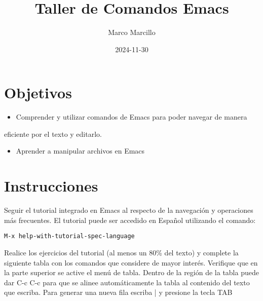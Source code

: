 \documentclass{article}
\author{Marco Marcillo}
\date{2024-11-30}
\title{Taller de Comandos Emacs}
\begin{document}
\maketitle
{}
\thispagestyle{fancy}






\section{Objetivos}
\label{sec:orgf910b6f}

\begin{itemize}
\item Comprender y utilizar comandos de Emacs para poder navegar de manera
\end{itemize}
eficiente por el texto y editarlo.

\begin{itemize}
\item Aprender a manipular archivos en Emacs
\end{itemize}

\section{Instrucciones}
\label{sec:orgdba02da}
Seguir el tutorial integrado en Emacs al respecto de la navegación y
operaciones más frecuentes. El tutorial puede ser accedido en Español
utilizando el comando:

\begin{verbatim}
M-x help-with-tutorial-spec-language
\end{verbatim}

Realice los ejercicios del tutorial (al menos un 80\% del texto) y
complete la siguiente tabla con los comandos que considere de mayor
interés. Verifique que en la parte superior se active el menú de
tabla. Dentro de la región de la tabla puede dar C-c C-c para que se
alinee automáticamente la tabla al contenido del texto que
escriba. Para generar una nueva fila escriba | y presione la tecla TAB
\end{document}
